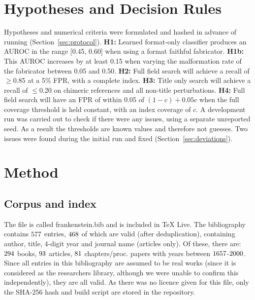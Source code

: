 \section{Hypotheses and Decision Rules}
Hypotheses and numerical criteria were formulated and hashed in advance of running (Section~\ref{sec:protocol}).
\textbf{H1:} Learned format-only classifier produces an AUROC in the range [0.45, 0.60] when using a format faithful fabricator.
\textbf{H1b:} This AUROC increases by at least 0.15 when varying the malformation rate of the fabricator between 0.05 and 0.50.
\textbf{H2:} Full field search will achieve a recall of $\geq$0.85 at a 5\% FPR, with a complete index.
\textbf{H3:} Title only search will achieve a recall of $\leq$0.20 on chimeric references and all non-title perturbations.
\textbf{H4:} Full field search will have an FPR of within 0.05 of $(1-c)+0.05c$ when the full coverage threshold is held constant, with an index coverage of $c$.
A development run was carried out to check if there were any issues, using a separate unreported seed. As a result the thresholds are known values and therefore not guesses. Two issues were found during the initial run and fixed (Section~\ref{sec:deviations}).

\section{Method}
\subsection{Corpus and index}
The file is called frankenstein.bib \cite{swift} and is included in TeX Live. The bibliography contains $ 577 $ entries, $468$ of which are valid (after 
deduplication), containing author, title, 4-digit year and journal name (articles only). Of these, there are: $ 294 $ books, $ 93 $
articles, $ 81 $ chapters/proc. papers with years between $1657$-$2000$. Since all entries in this bibliography are assumed to be
real works (since it is considered as the researchers library, although we were unable to confirm this independently), they are all valid. As there was no
licence given for this file, only the SHA-256 hash and build script are stored in the repository.



